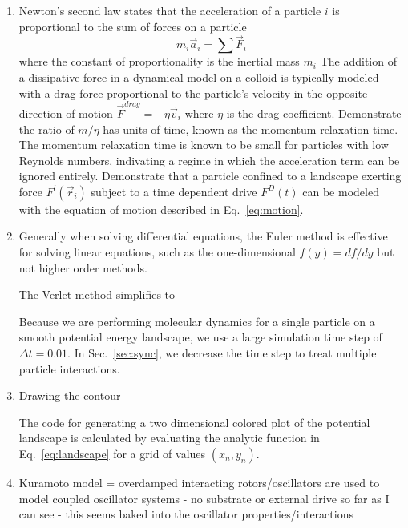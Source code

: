 \documentclass[twocolumn,preprintnumbers,amsmath,amssymb,aps,prx]{revtex4}
\begin{document}
\begin{enumerate}
\item Newton's second law states that
  the acceleration of a particle $i$
  is proportional to 
  the sum of forces on a particle 
  \begin{equation}
  m_i \vec{a}_i = \sum \vec{F}_i
  \label{eq:n2l}
  \end{equation}
  where the constant of proportionality is the
  inertial mass $m_i$
  The addition of a dissipative force in a dynamical model
  on a colloid is typically modeled
  with a drag force proportional to the particle's velocity
  in the opposite direction of motion 
  $\vec{F}^{drag} = - \eta \vec{v}_i$
  where $\eta$ is the drag coefficient.
  Demonstrate
  the ratio of $m/\eta$ has units of time, 
  known as the momentum relaxation time.
  The momentum relaxation time is 
  known to be small for
  particles with low Reynolds numbers,
  indivating 
  a regime in which the acceleration term can be ignored
  entirely.
  Demonstrate that a particle confined to a landscape exerting force
  $F^l(\vec{r}_i)$ subject to a time dependent drive $F^D(t)$
  can be modeled with the equation of motion described in 
  Eq.~\ref{eq:motion}. 
  \label{ex:n2l}

\item
  Generally when solving differential equations,
  the Euler method is effective for solving linear equations,
  such as the one-dimensional 
  $f(y) = df/dy$ 
  but not higher order methods.

  The Verlet method simplifies to

  Because we are performing molecular dynamics
  for a single particle on a smooth potential energy landscape,
  we use a large simulation time step of 
  $\Delta t = 0.01$.
  In Sec.~\ref{sec:sync},
  we decrease the time step
  to treat multiple particle interactions.

  \label{ex:euler}

\item Drawing the contour

  The code for generating
a two dimensional colored plot
of the potential landscape
is calculated by evaluating
the analytic function in Eq.~\ref{eq:landscape}
for a grid of values $(x_n,y_n)$.
  
\item Kuramoto model = overdamped interacting rotors/oscillators are used to model coupled oscillator systems - no substrate or external drive so far as I can see - this seems baked into the oscillator properties/interactions


\end{enumerate}
\end{document}
